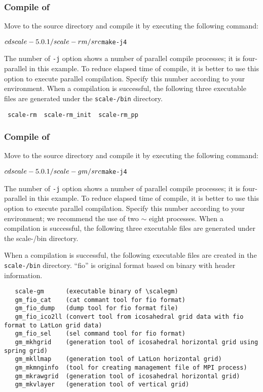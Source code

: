\subsubsection{Compile of \scalerm} %

Move to the \scalerm source directory
and compile it by executing the following command:
\begin{alltt}
 $ cd scale-{\version}/scale-rm/src
 $ make -j 4
\end{alltt}
The number of \verb|-j| option shows a number of parallel compile processes;
it is four-parallel in this example.
To reduce elapsed time of compile,
it is better to use this option to execute parallel compilation.
Specify this number according to your environment.
When a compilation is successful,
the following three executable files are generated under the \texttt{scale-{\version}/bin} directory.
\begin{verbatim}
 scale-rm  scale-rm_init  scale-rm_pp
\end{verbatim}


\subsubsection{Compile of \scalegm} %

Move to the \scalegm source directory 
and compile it by executing the following command:
\begin{alltt}
  $  cd scale-{\version}/scale-gm/src
  $  make -j 4
\end{alltt}

The number of \verb|-j| option shows a number of parallel compile processes;
it is four-parallel in this example.
To reduce elapsed time of compile, 
it is better to use this option to execute parallel compilation.
Specify this number according to your environment;
we recommend the use of two $\sim$ eight processes.
When a compilation is successful,
the following three executable files are generated under the scale-{\version}/bin directory.

When a compilation is successful,
the following executable files are created in the \texttt{scale-{\version}/bin} directory.
``fio'' is original format based on binary with header information.
\begin{verbatim}
   scale-gm      (executable binary of \scalegm)
   gm_fio_cat    (cat commant tool for fio format)
   gm_fio_dump   (dump tool for fio format file)
   gm_fio_ico2ll (convert tool from icosahedral grid data with fio format to LatLon grid data)
   gm_fio_sel    (sel command tool for fio format)
   gm_mkhgrid    (generation tool of icosahedral horizontal grid using spring grid)
   gm_mkllmap    (generation tool of LatLon horizontal grid)
   gm_mkmnginfo  (tool for creating management file of MPI process)
   gm_mkrawgrid  (generation tool of icosahedral horizontal grid)
   gm_mkvlayer   (generation tool of vertical grid)
\end{verbatim}


